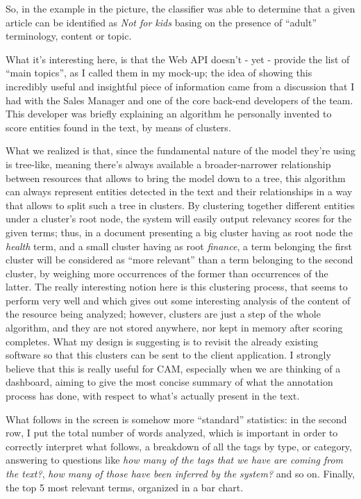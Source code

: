 \documentclass[12pt,oneside,svgnames]{memoir}
\begin{document}
So, in the example in the picture, the classifier was able to determine
that a given article can be identified as \emph{Not for kids} basing on
the presence of ``adult'' terminology, content or topic.

What it's interesting here, is that the Web API doesn't - yet - provide
the list of ``main topics'', as I called them in my mock-up; the idea of
showing this incredibly useful and insightful piece of information came
from a discussion that I had with the Sales Manager and one of the core
back-end developers of the team. This developer was briefly explaining
an algorithm he personally invented to score entities found in the text,
by means of clusters.

What we realized is that, since the fundamental nature of the model
they're using is tree-like, meaning there's always available a
broader-narrower relationship between resources that allows to bring the
model down to a tree, this algorithm can always represent entities
detected in the text and their relationships in a way that allows to
split such a tree in clusters. By clustering together different entities
under a cluster's root node, the system will easily output relevancy
scores for the given terms; thus, in a document presenting a big cluster
having as root node the \emph{health} term, and a small cluster having
as root \emph{finance}, a term belonging the first cluster will be
considered as ``more relevant'' than a term belonging to the second
cluster, by weighing more occurrences of the former than occurrences of
the latter. The really interesting notion here is this clustering
process, that seems to perform very well and which gives out some
interesting analysis of the content of the resource being analyzed;
however, clusters are just a step of the whole algorithm, and they are
not stored anywhere, nor kept in memory after scoring completes. What my
design is suggesting is to revisit the already existing software so that
this clusters can be sent to the client application. I strongly believe
that this is really useful for CAM, especially when we are thinking of a
dashboard, aiming to give the most concise summary of what the
annotation process has done, with respect to what's actually present in
the text. \parskip0pt

What follows in the screen is somehow more ``standard'' statistics: in
the second row, I put the total number of words analyzed, which is
important in order to correctly interpret what follows, a breakdown of
all the tags by type, or category, answering to questions like \emph{how
many of the tags that we have are coming from the text?}, \emph{how many
of those have been inferred by the system?} and so on. Finally, the top
5 most relevant terms, organized in a bar chart.
\end{document}

